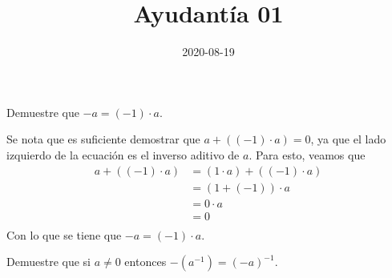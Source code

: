 \documentclass{ayudantia}
\title{Ayudantía 01}
\date{2020-08-19}
\begin{document}
\maketitle

\begin{prob}
    Demuestre que \(-a=(-1)\cdot a\).
\end{prob}

\begin{ans}
    \begin{sol}
        Se nota que es suficiente demostrar que \(a+((-1)\cdot a)=0\), ya que el lado izquierdo de la ecuación es el inverso aditivo de \(a\). Para esto, veamos que
        \begin{align*}
            a+((-1)\cdot a)&=(1\cdot a)+((-1)\cdot a)\\
            &=(1+(-1))\cdot a\\
            &=0\cdot a\\
            &=0\\
        \end{align*}
        Con lo que se tiene que \(-a=(-1)\cdot a\).
    \end{sol}
\end{ans}


\begin{prob}
    Demuestre que si \(a\neq0\) entonces \(-(a^{-1})=(-a)^{-1}\).
\end{prob}
\end{document}
